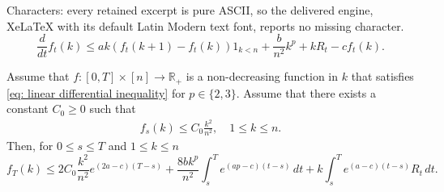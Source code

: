 \documentclass[10pt,a4paper]{amsart}
\def\R{{\mathbb R}}
\begin{document}
Characters: every retained excerpt is pure ASCII, so the delivered engine, XeLaTeX with its default Latin Modern text font, reports no missing character.
\begin{equation}
\label{eq: linear differential inequality}
    \frac{d}{dt}f_t(k)\leq ak(f_t(k+1)-f_t(k))1_{k < n}  + \frac{b}{n^2}k^p + kR_t - cf_t(k).
\end{equation}

\begin{lemma}
  \label{lm: linear differential inequality}
  Assume that $f:[0,T]\times [n]\to \R_+$ is a non-decreasing function in $k$ that satisfies \eqref{eq: linear differential inequality} for $p\in\{2,3\}$. Assume that there exists a constant $C_0\geq 0$ such that 
  \begin{align}
  \label{eq: yule process initial condition}
      f_s(k)\leq C_0\frac{k^2}{n^2}, \quad 1 \le k \le n.
  \end{align}
  Then, for $0 \le s \le T$ and $1 \le k \le n$
    \begin{equation*}
        f_T(k)\leq 2C_0\frac{k^2}{n^2} e^{(2a-c)(T-s)}+\frac{8bk^p}{n^2}\int_s^T e^{(ap-c)(t-s)} \,dt + k\int_s^T e^{(a-c)(t-s)} R_t \,dt.
    \end{equation*}
\end{lemma}
\end{document}
